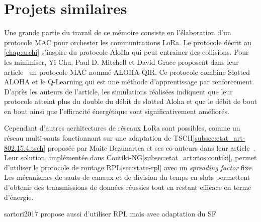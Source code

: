 \section{Projets similaires}\label{sec:etat_art-related-work}
\renewcommand{\rightmark}{Projet similaires}

Une grande partie du travail de ce mémoire consiste en l'élaboration d'un protocole MAC pour
orchester les communications LoRa. Le protocole décrit au \autoref{chap:archi} s'inspire du
protocole AloHa qui peut entrainer des collisions. Pour les minimiser, Yi Chu, Paul D. Mitchell et
David Grace proposent dans leur article~\cite{6328420} un protocole MAC nommé ALOHA-QIR. Ce
protocole combine Slotted ALOHA et le Q-Learning qui est une méthode d'apprentissage par
renforcement. D'après les auteurs de l'article, les simulations réalisées indiquent que leur
protocole atteint plus du double du débit de slotted Aloha et que le débit de bout en bout ainsi
que l'efficacité énergétique sont significativement améliorés.


Cependant d'autres acrhitectures de réseaux LoRa sont possibles, comme un réseau multi-sauts
fonctionnant sur une adaptation de TSCH\ref{subsec:etat_art-802.15.4.tsch} proposée par Maite Bezunartea et ses co-auteurs dans leur article~\cite{8847137}. Leur solution, implémentée dans Contiki-NG\ref{subsec:etat_art:rtos:contiki}, permet d'utiliser le protocole de routage RPL\ref{sec:state-rpl} avec un \textit{spreading factor} fixe. Les mécanismes de sauts de canaux et de division du temps en slots permettent d'obtenir des transmissions de données réussies tout en restant efficace en terme d'énergie. 


sartori2017 propose aussi d'utiliser RPL mais avec adaptation du SF

% 
